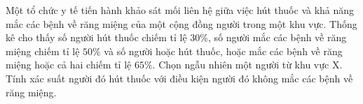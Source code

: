\begin{ex}
Một tổ chức y tế tiến hành khảo sát mối liên hệ giữa việc hút thuốc và khả năng mắc các bệnh về răng miệng của một cộng đồng người trong một khu vực. Thống kê cho thấy số người hút thuốc chiếm tỉ lệ $30\%$, số người mắc các bệnh về răng miệng chiếm tỉ lệ $50\%$ và số người hoặc hút thuốc, hoặc mắc các bệnh về răng miệng hoặc cả hai chiếm tỉ lệ $65\%$. Chọn ngẫu nhiên một người từ khu vực X. Tính xác suất người đó hút thuốc với điều kiện người đó không mắc các bệnh về răng miệng.
\end{ex}
